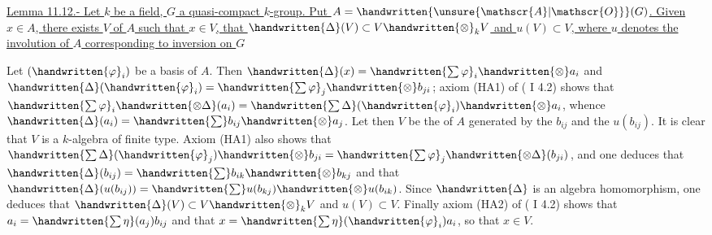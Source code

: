 

\uline{Lemma 11.12.- Let $k$ be a field, $G$ a quasi-compact $k$-group. Put $A=\handwritten{\unsure{\mathscr{A}|\mathscr{O}}}(G)$. Given $x\in A$, there exists  $V$ of $A$ such that $x\in V$, that $\handwritten{\Delta}(V)\subset V\handwritten{\otimes}_k V$ and $u(V)\subset V$, where $u$ denotes the involution of $A$ corresponding to inversion on $G$}


Let $(\handwritten{\varphi}_i)$ be a basis of $A$. Then $\handwritten{\Delta}(x)=\handwritten{\sum\varphi}_i\handwritten{\otimes}a_i$ and $\handwritten{\Delta}(\handwritten{\varphi}_i)=\handwritten{\sum\varphi}_j\handwritten{\otimes}b_{ji}$; axiom (HA1) of ( I 4.2) shows that $\handwritten{\sum\varphi}_i\handwritten{\otimes\Delta}(a_i)=\handwritten{\sum\Delta}(\handwritten{\varphi}_i)\handwritten{\otimes}a_i$, whence $\handwritten{\Delta}(a_i)=\handwritten{\sum}b_{ij}\handwritten{\otimes}a_j$. Let then $V$ be the  of $A$ generated by the $b_{ij}$ and the $u(b_{ij})$. It is clear that $V$ is a $k$-algebra of finite type. Axiom (HA1) also shows that $\handwritten{\sum\Delta}(\handwritten{\varphi}_j)\handwritten{\otimes}b_{ji}=\handwritten{\sum\varphi}_j\handwritten{\otimes\Delta}(b_{ji})$, and one deduces that $\handwritten{\Delta}(b_{ij})=\handwritten{\sum}b_{ik}\handwritten{\otimes}b_{kj}$ and that $\handwritten{\Delta}(u(b_{ij}))=\handwritten{\sum}u(b_{kj})\handwritten{\otimes}u(b_{ik})$. Since $\handwritten{\Delta}$ is an algebra homomorphism, one deduces that $\handwritten{\Delta}(V)\subset V\handwritten{\otimes}_k V$ and $u(V)\subset V$. Finally axiom (HA2) of ( I 4.2) shows that $a_i=\handwritten{\sum\eta}(a_j)b_{ij}$ and that $x=\handwritten{\sum\eta}(\handwritten{\varphi}_i)a_i$, so that $x\in V$.

